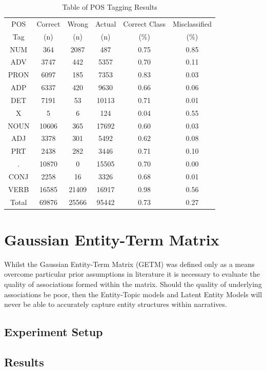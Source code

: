 \documentclass[10pt]{report}
\begin{document}
\renewcommand{\baselinestretch}{1.0}\normalsize
\renewcommand{\arraystretch}{1.2}
\begin{table}[h!]
  \centering
  \begin{tabular}{c | c | c | c || c | c }
  POS &	Correct &	Wrong &	Actual&	 Correct Class&Misclassified\\
  Tag & (n)&(n)&(n)&(\%)&(\%)  
  \\\hline
    NUM  &364   &	2087&	487&	0.75&	0.85
  \\ADV  &3747  &	442&	5357&	0.70&	0.11
  \\PRON &6097  &	185&	7353&	0.83&	0.03
  \\ADP  &6337  &	420&	9630&	0.66&	0.06
  \\DET  &7191  &	53&	10113&	0.71&	0.01
  \\X    &5     &	6&	124&	0.04&	0.55
  \\NOUN &10606 &	365&	17692&	0.60&	0.03
  \\ADJ  &3378  &	301&	5492&	0.62&	0.08
  \\PRT  &2438  &	282&	3446&	0.71&	0.10
  \\.    &10870 &	0&	15505&	0.70&	0.00
  \\CONJ &2258  &	16&	3326&	0.68&	0.01
  \\VERB &16585 &	21409&	16917&	0.98&	0.56
  \\\hline
  Total &69876&	25566&	95442&	0.73&	0.27
\end{tabular}
\caption{ Table of POS Tagging Results\label{tab:pos_results}}
\end{table}
\renewcommand{\baselinestretch}{2.0}\normalsize
\renewcommand{\arraystretch}{1.0}

\section{Gaussian Entity-Term Matrix}
Whilst the Gaussian Entity-Term Matrix (GETM) was defined only as a means overcome particular prior assumptions in literature it is necessary to evaluate the quality of associations formed within the matrix. Should the quality of underlying associations be poor, then the Entity-Topic models and Latent Entity Models will never be able to accurately capture entity structures within narratives.

\subsection{Experiment Setup}

\subsection{Results}
\end{document}
